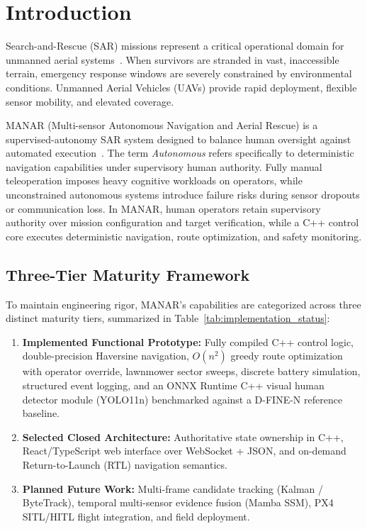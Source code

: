 \section{Introduction}

Search-and-Rescue (SAR) missions represent a critical operational domain for unmanned aerial systems~\cite{silvagni2017multipurpose}. When survivors are stranded in vast, inaccessible terrain, emergency response windows are severely constrained by environmental conditions. Unmanned Aerial Vehicles (UAVs) provide rapid deployment, flexible sensor mobility, and elevated coverage.

MANAR (Multi-sensor Autonomous Navigation and Aerial Rescue) is a supervised-autonomy SAR system designed to balance human oversight against automated execution~\cite{goodrich2008towards}. The term \emph{Autonomous} refers specifically to deterministic navigation capabilities under supervisory human authority. Fully manual teleoperation imposes heavy cognitive workloads on operators, while unconstrained autonomous systems introduce failure risks during sensor dropouts or communication loss. In MANAR, human operators retain supervisory authority over mission configuration and target verification, while a C++ control core executes deterministic navigation, route optimization, and safety monitoring.

\subsection{Three-Tier Maturity Framework}
To maintain engineering rigor, MANAR's capabilities are categorized across three distinct maturity tiers, summarized in Table~\ref{tab:implementation_status}:
\begin{enumerate}
    \item \textbf{Implemented Functional Prototype:} Fully compiled C++ control logic, double-precision Haversine navigation, $O(n^2)$ greedy route optimization with operator override, lawnmower sector sweeps, discrete battery simulation, structured event logging, and an ONNX Runtime C++ visual human detector module (YOLO11n) benchmarked against a D-FINE-N reference baseline.
    \item \textbf{Selected Closed Architecture:} Authoritative state ownership in C++, React/TypeScript web interface over WebSocket + JSON, and on-demand Return-to-Launch (RTL) navigation semantics.
    \item \textbf{Planned Future Work:} Multi-frame candidate tracking (Kalman / ByteTrack), temporal multi-sensor evidence fusion (Mamba SSM), PX4 SITL/HITL flight integration, and field deployment.
\end{enumerate}

